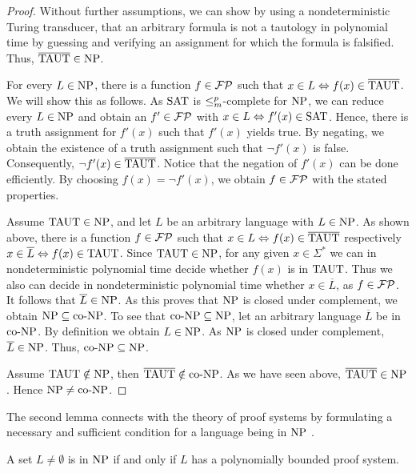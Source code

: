   \begin{proof}
    Without further assumptions, we can show by using a nondeterministic Turing transducer, that an arbitrary formula is not a tautology in polynomial time by guessing and verifying an assignment for which the formula is falsified. Thus, \(\overline{\text{TAUT}} \in \text{NP}\).

    For every \(L \in \text{NP}\), there is a function \(f \in \mathcal{FP}\) such that \(x \in L \Leftrightarrow f(x) \in \overline{\text{TAUT}}\). We will show this as follows. As \(\text{SAT}\) is \(\leq_{m}^{p}\)-complete for \(\text{NP}\), we can reduce every \(L \in \text{NP}\) and obtain an \(f' \in \mathcal{FP}\) with \(x \in L \Leftrightarrow f'(x) \in \text{SAT}\). Hence, there is a truth assignment for \(f'(x)\) such that \(f'(x)\) yields true. By negating, we obtain the existence of a truth assignment such that \(\neg f'(x)\) is false. Consequently, \(\neg f'(x) \in \overline{\text{TAUT}}\). Notice that the negation of \(f'(x)\) can be done efficiently. By choosing \(f(x) = \neg f'(x)\), we obtain \(f \in \mathcal{FP}\) with the stated properties.

    Assume \(\text{TAUT} \in \text{NP}\), and let \(L\) be an arbitrary language with \(L \in \text{NP}\). As shown above, there is a function \(f \in \mathcal{FP}\) such that \(x \in L \Leftrightarrow f(x) \in \overline{\text{TAUT}}\) respectively \(x \in \overline{L} \Leftrightarrow f(x) \in \text{TAUT}\). Since \(\text{TAUT} \in \text{NP}\), for any given \(x \in \Sigma^*\) we can in nondeterministic polynomial time decide whether \(f(x)\) is in \(\text{TAUT}\). Thus we also can decide in nondeterministic polynomial time whether \(x \in \overline{L}\), as \(f \in \mathcal{FP}\). It follows that \(\overline{L} \in \text{NP}\). As this proves that \(\text{NP}\) is closed under complement, we obtain \(\text{NP} \subseteq \text{co-NP}\). To see that \(\text{co-NP} \subseteq \text{NP}\), let an arbitrary language \(\overline{L}\) be in \(\text{co-NP}\). By definition we obtain \(L \in \text{NP}\). As \(\text{NP}\) is closed under complement, \(\overline{L} \in \text{NP}\). Thus, \(\text{co-NP} \subseteq \text{NP}\).

    Assume \(\text{TAUT} \notin \text{NP}\), then \(\overline{\text{TAUT}} \notin \text{co-NP}\). As we have seen above, \(\overline{\text{TAUT}} \in \text{NP}\). Hence \(\text{NP} \neq \text{co-NP}\).
  \end{proof}

  The second lemma connects with the theory of proof systems by formulating a necessary and sufficient condition for a language being in \(\text{NP}\) \cite{CR79}.

  \begin{lemma} \label{lemNPPolyBoundProofSystem}
    A set \(L \neq \emptyset\) is in \(\text{NP}\) if and only if \(L\) has a polynomially bounded proof system.
  \end{lemma}

